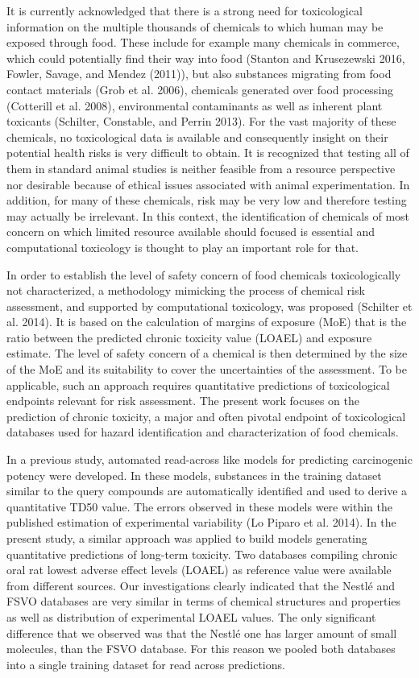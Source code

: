 \documentclass[]{achemso}
\begin{document}
It is currently acknowledged that there is a strong need for
toxicological information on the multiple thousands of chemicals to
which human may be exposed through food. These include for example many
chemicals in commerce, which could potentially find their way into food
(Stanton and Krusezewski 2016, Fowler, Savage, and Mendez (2011)), but
also substances migrating from food contact materials (Grob et al.
2006), chemicals generated over food processing (Cotterill et al. 2008),
environmental contaminants as well as inherent plant toxicants
(Schilter, Constable, and Perrin 2013). For the vast majority of these
chemicals, no toxicological data is available and consequently insight
on their potential health risks is very difficult to obtain. It is
recognized that testing all of them in standard animal studies is
neither feasible from a resource perspective nor desirable because of
ethical issues associated with animal experimentation. In addition, for
many of these chemicals, risk may be very low and therefore testing may
actually be irrelevant. In this context, the identification of chemicals
of most concern on which limited resource available should focused is
essential and computational toxicology is thought to play an important
role for that.

In order to establish the level of safety concern of food chemicals
toxicologically not characterized, a methodology mimicking the process
of chemical risk assessment, and supported by computational toxicology,
was proposed (Schilter et al. 2014). It is based on the calculation of
margins of exposure (MoE) that is the ratio between the predicted
chronic toxicity value (LOAEL) and exposure estimate. The level of
safety concern of a chemical is then determined by the size of the MoE
and its suitability to cover the uncertainties of the assessment. To be
applicable, such an approach requires quantitative predictions of
toxicological endpoints relevant for risk assessment. The present work
focuses on the prediction of chronic toxicity, a major and often pivotal
endpoint of toxicological databases used for hazard identification and
characterization of food chemicals.

In a previous study, automated read-across like models for predicting
carcinogenic potency were developed. In these models, substances in the
training dataset similar to the query compounds are automatically
identified and used to derive a quantitative TD50 value. The errors
observed in these models were within the published estimation of
experimental variability (Lo Piparo et al. 2014). In the present study,
a similar approach was applied to build models generating quantitative
predictions of long-term toxicity. Two databases compiling chronic oral
rat lowest adverse effect levels (LOAEL) as reference value were
available from different sources. Our investigations clearly indicated
that the Nestlé and FSVO databases are very similar in terms of chemical
structures and properties as well as distribution of experimental LOAEL
values. The only significant difference that we observed was that the
Nestlé one has larger amount of small molecules, than the FSVO database.
For this reason we pooled both databases into a single training dataset
for read across predictions.
\end{document}
